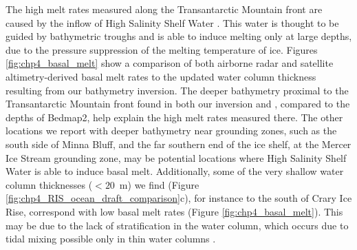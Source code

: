 The high melt rates measured along the Transantarctic Mountain front \citep{adusumilliinterannual2020} are caused by the inflow of High Salinity Shelf Water \citep{tintoross2019}. This water is thought to be guided by bathymetric troughs and is able to induce melting only at large depths, due to the pressure suppression of the melting temperature of ice. Figures \ref{fig:chp4_basal_melt} show a comparison of both airborne radar and satellite altimetry-derived basal melt rates to the updated water column thickness resulting from our bathymetry inversion. The deeper bathymetry proximal to the Transantarctic Mountain front found in both our inversion and \citet{tintoross2019}, compared to the depths of Bedmap2, help explain the high melt rates measured there. The other locations we report with deeper bathymetry near grounding zones, such as the south side of Minna Bluff, and the far southern end of the ice shelf, at the Mercer Ice Stream grounding zone, may be potential locations where High Salinity Shelf Water is able to induce basal melt. Additionally, some of the very shallow water column thicknesses ($<20$~m) we find (Figure \ref{fig:chp4_RIS_ocean_draft_comparison}c), for instance to the south of Crary Ice Rise, correspond with low basal melt rates (Figure \ref{fig:chp4_basal_melt}). This may be due to the lack of stratification in the water column, which occurs due to tidal mixing possible only in thin water columns \citep{mutobathymetry2013, hollandmodel2008}.




